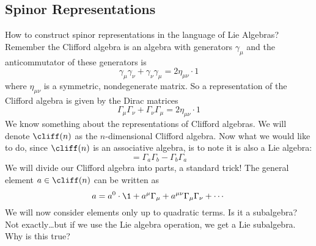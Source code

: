 \subsection{Spinor Representations}
How to construct spinor representations in the language of Lie
Algebras? Remember the Clifford algebra is an algebra with
generators $\gamma_{\mu}$ and the anticommutator of these
generators is
\begin{equation}
\gamma_{\mu}\gamma_{\nu}+\gamma_{\nu}\gamma_{\mu}=2\eta_{\mu\nu}\cdot1
\end{equation}
where $\eta_{\mu\nu}$ is a symmetric, nondegenerate matrix. So a
representation of the Clifford algebra is given by the Dirac
matrices
\begin{equation}
\Gamma_{\mu}\Gamma_{\nu}+\Gamma_{\nu}\Gamma_{\mu}=2\eta_{\mu\nu}\cdot1
\end{equation}
We know something about the representations of Clifford
algebras. We will denote $\cliff(n)$ as the $n$-dimensional
Clifford algebra. Now what we would like to do, since $\cliff(n)$
is an associative algebra, is to note it is also a Lie algebra:
\begin{equation}
[\Gamma_{a},\Gamma_{b}] =
\Gamma_{a}\Gamma_{b}-\Gamma_{b}\Gamma_{a}
\end{equation}
We will divide our Clifford algebra into parts, a standard trick!
The general element $a\in\cliff(n)$ can be written as
\begin{equation}
a = a^{0}\cdot\1 + a^{\mu}\Gamma_{\mu} + a^{\mu\nu}\Gamma_{\mu}\Gamma_{\nu}+\cdots
\end{equation}
We will now consider elements only up to quadratic terms. Is it a
subalgebra? Not exactly\dots but if we use the Lie algebra
operation, we get a Lie subalgebra. Why is this true?

